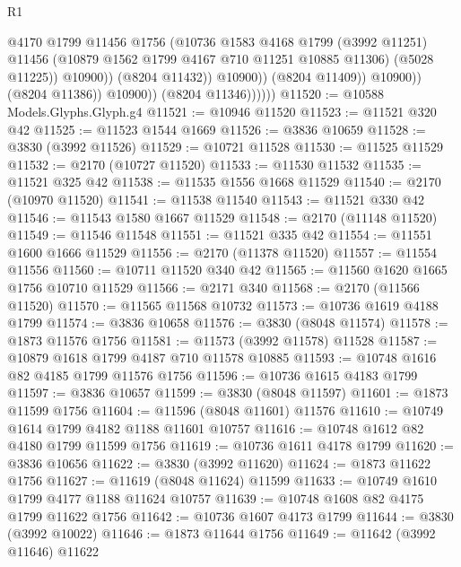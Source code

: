 \begin{lexlean}{R1}
\begin{coremodule}
                                    @4170
                                    @1799
                                    @11456
                                    @1756
                                    (@10736
                                      @1583
                                      @4168
                                      @1799
                                      (@3992 @11251)
                                      @11456
                                      (@10879 @1562 @1799 @4167 @710 @11251 @10885 @11306)
                                      (@5028 @11225))
                                    @10900))
                                (@8204 @11432))
                              @10900))
                          (@8204 @11409))
                        @10900))
                    (@8204 @11386))
                  @10900))
              (@8204 @11346))))))
@11520 := @10588 Models.Glyphs.Glyph.g4
@11521 := @10946 @11520
@11523 := @11521 @320 @42
@11525 := @11523 @1544 @1669
@11526 := @3836 @10659
@11528 := @3830 (@3992 @11526)
@11529 := @10721 @11528
@11530 := @11525 @11529
@11532 := @2170 (@10727 @11520)
@11533 := @11530 @11532
@11535 := @11521 @325 @42
@11538 := @11535 @1556 @1668 @11529
@11540 := @2170 (@10970 @11520)
@11541 := @11538 @11540
@11543 := @11521 @330 @42
@11546 := @11543 @1580 @1667 @11529
@11548 := @2170 (@11148 @11520)
@11549 := @11546 @11548
@11551 := @11521 @335 @42
@11554 := @11551 @1600 @1666 @11529
@11556 := @2170 (@11378 @11520)
@11557 := @11554 @11556
@11560 := @10711 @11520 @340 @42
@11565 := @11560 @1620 @1665 @1756 @10710 @11529
@11566 := @2171 @340
@11568 := @2170 (@11566 @11520)
@11570 := @11565 @11568 @10732
@11573 := @10736 @1619 @4188 @1799
@11574 := @3836 @10658
@11576 := @3830 (@8048 @11574)
@11578 := @1873 @11576 @1756
@11581 := @11573 (@3992 @11578) @11528
@11587 := @10879 @1618 @1799 @4187 @710 @11578 @10885
@11593 := @10748 @1616 @82 @4185 @1799 @11576 @1756
@11596 := @10736 @1615 @4183 @1799
@11597 := @3836 @10657
@11599 := @3830 (@8048 @11597)
@11601 := @1873 @11599 @1756
@11604 := @11596 (@8048 @11601) @11576
@11610 := @10749 @1614 @1799 @4182 @1188 @11601 @10757
@11616 := @10748 @1612 @82 @4180 @1799 @11599 @1756
@11619 := @10736 @1611 @4178 @1799
@11620 := @3836 @10656
@11622 := @3830 (@3992 @11620)
@11624 := @1873 @11622 @1756
@11627 := @11619 (@8048 @11624) @11599
@11633 := @10749 @1610 @1799 @4177 @1188 @11624 @10757
@11639 := @10748 @1608 @82 @4175 @1799 @11622 @1756
@11642 := @10736 @1607 @4173 @1799
@11644 := @3830 (@3992 @10022)
@11646 := @1873 @11644 @1756
@11649 := @11642 (@3992 @11646) @11622

\end{coremodule}
\end{lexlean}
